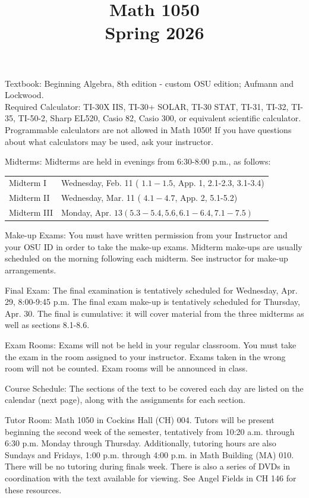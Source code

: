 \documentclass{ximera}
\title{Math 1050 \\
 Spring 2026 }
\author{}
\date{}
\begin{document}
Textbook: Beginning Algebra, 8th edition - custom OSU edition; Aufmann and Lockwood.\\
Required Calculator: TI-30X IIS, TI-30+ SOLAR, TI-30 STAT, TI-31, TI-32, TI-35, TI-50-2, Sharp EL520, Casio 82, Casio 300, or equivalent scientific calculator. Programmable calculators are not allowed in Math 1050! If you have questions about what calculators may be used, ask your instructor.

Midterms: Midterms are held in evenings from 6:30-8:00 p.m., as follows:

\begin{center}
\begin{tabular}{ll}
Midterm I & Wednesday, Feb. 11 ( $1.1-1.5$, App. 1, 2.1-2.3, 3.1-3.4) \\
Midterm II & Wednesday, Mar. 11 ( $4.1-4.7$, App. 2, 5.1-5.2) \\
Midterm III & Monday, Apr. $13(5.3-5.4,5.6,6.1-6.4,7.1-7.5)$ \\
\end{tabular}
\end{center}

Make-up Exams: You must have written permission from your Instructor and your OSU ID in order to take the make-up exams. Midterm make-ups are usually scheduled on the morning following each midterm. See instructor for make-up arrangements.

Final Exam: The final examination is tentatively scheduled for Wednesday, Apr. 29, 8:00-9:45 p.m. The final exam make-up is tentatively scheduled for Thursday, Apr. 30. The final is cumulative: it will cover material from the three midterms as well as sections 8.1-8.6.

Exam Rooms: Exams will not be held in your regular classroom. You must take the exam in the room assigned to your instructor. Exams taken in the wrong room will not be counted. Exam rooms will be announced in class.

Course Schedule: The sections of the text to be covered each day are listed on the calendar (next page), along with the assignments for each section.

Tutor Room: Math 1050 in Cockins Hall (CH) 004. Tutors will be present beginning the second week of the semester, tentatively from 10:20 a.m. through 6:30 p.m. Monday through Thursday. Additionally, tutoring hours are also Sundays and Fridays, 1:00 p.m. through 4:00 p.m. in Math Building (MA) 010. There will be no tutoring during finals week. There is also a series of DVDs in coordination with the text available for viewing. See Angel Fields in CH 146 for these resources.
\end{document}
